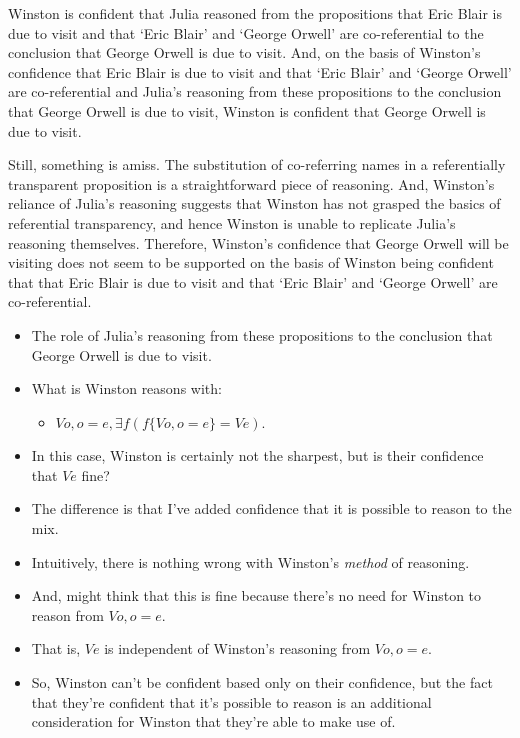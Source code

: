 \documentclass[10pt]{article}
\newcommand{\hozlinedash}[0]{%
  \noindent\hdashrule[0.5ex][c]{\textwidth}{.1pt}{2.5pt}
}
\begin{document}
Winston is confident that Julia reasoned from the propositions that Eric Blair is due to visit and that `Eric Blair' and `George Orwell' are co-referential to the conclusion that George Orwell is due to visit.
And, on the basis of Winston's confidence that Eric Blair is due to visit and that `Eric Blair' and `George Orwell' are co-referential and Julia's reasoning from these propositions to the conclusion that George Orwell is due to visit, Winston is confident that George Orwell is due to visit.

Still, something is amiss.
The substitution of co-referring names in a referentially transparent proposition is a straightforward piece of reasoning.
And, Winston's reliance of Julia's reasoning suggests that Winston has not grasped the basics of referential transparency, and hence Winston is unable to replicate Julia's reasoning themselves.
Therefore, Winston's confidence that George Orwell will be visiting does not seem to be supported on the basis of Winston being confident that that Eric Blair is due to visit and that `Eric Blair' and `George Orwell' are co-referential.

\hozlinedash

\begin{itemize}
\item The role of Julia's reasoning from these propositions to the conclusion that George Orwell is due to visit.
\end{itemize}

\begin{itemize}
\item What is Winston reasons with:
  \begin{itemize}
  \item \(Vo, o = e, \exists f(f\{Vo, o = e\} = Ve)\).
  \end{itemize}
\item In this case, Winston is certainly not the sharpest, but is their confidence that \(Ve\) fine?
\item The difference is that I've added confidence that it is possible to reason to the mix.
\item Intuitively, there is nothing wrong with Winston's \emph{method} of reasoning.
\item And, might think that this is fine because there's no need for Winston to reason from \(Vo, o = e\).
\item That is, \(Ve\) is independent of Winston's reasoning from \(Vo, o = e\).
\item So, Winston can't be confident based only on their confidence, but the fact that they're confident that it's possible to reason is an additional consideration for Winston that they're able to make use of.
\end{itemize}
\end{document}
